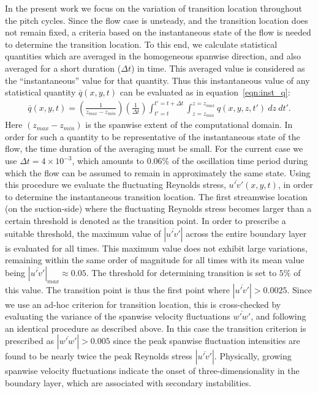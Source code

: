 In the present work we focus on the variation of transition location throughout the pitch cycles. Since the flow case is unsteady, and the transition location does not remain fixed, a criteria based on the instantaneous state of the flow is needed to determine the transition location. To this end, we calculate statistical quantities which are averaged in the homogeneous spanwise direction, and also averaged for a short duration ($\Delta t$) in time. This averaged value is considered as the ``instantaneous'' value for that quantity. Thus this instantaneous value of any statistical quantity $\overline{q}(x,y,t)$ can be evaluated as in equation~\ref{eqn:inst_q}:
\begin{align}
	\overline{q}(x,y,t) = \left(\frac{1}{z_{max}-z_{min}}\right)\left(\frac{1}{\Delta t}\right)\int_{t'=t}^{t'=t+\Delta t}\int_{z=z_{min}}^{z=z_{max}}q(x,y,z,t')\ dz\ dt'.
	\label{eqn:inst_q}
\end{align}
Here $(z_{max}-z_{min})$ is the spanwise extent of the computational domain. In order for such a quantity to be representative of the instantaneous state of the flow, the time duration of the averaging must be small. For the current case we use $\Delta t=4\times10^{-3}$, which amounts to $0.06\%$ of the oscillation time period during which the flow can be assumed to remain in approximately the same state. Using this procedure we evaluate the fluctuating Reynolds stress, $\overline{u'v'}(x,y,t)$, in order to determine the instantaneous transition location. The first streamwise location (on the suction-side) where the fluctuating Reynolds stress becomes larger than a certain threshold is denoted as the transition point. 
In order to prescribe a suitable threshold, the maximum value of $|\overline{u'v'}|$ across the entire boundary layer is evaluated for all times. This maximum value does not exhibit large variations, remaining within the same order of magnitude for all times with its mean value being $|\overline{u'v'}|_{max}\approx0.05$. The threshold for determining transition is set to $5\%$ of this value. The transition point is thus the first point where $|\overline{u'v'}|>0.0025$. Since we use an ad-hoc criterion for transition location, this is cross-checked by evaluating the variance of the spanwise velocity fluctuations $\overline{w'w'}$, and following an identical procedure as described above. In this case the transition criterion is prescribed as $|\overline{w'w'}|>0.005$ since the peak spanwise fluctuation intensities are found to be nearly twice the peak Reynolds stress $|\overline{u'v'}|$. Physically, growing spanwise velocity fluctuations indicate the onset of three-dimensionality in the boundary layer, which are associated with secondary instabilities.
